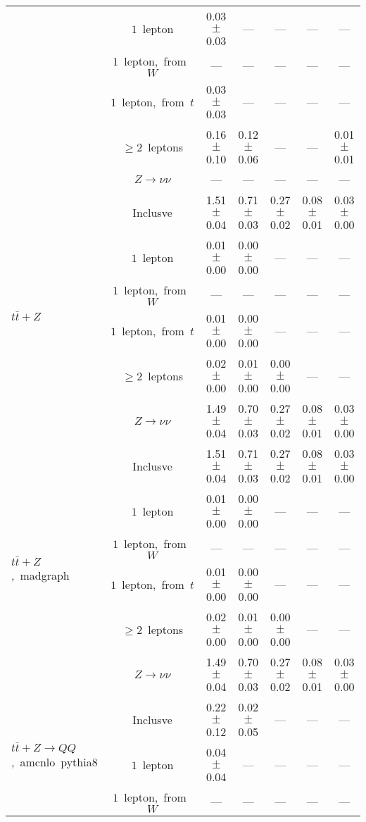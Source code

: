 \documentclass{article}
\begin{document}
\begin{longtable}{|l|c|c|c|c|c|c|}
 & $1$~lepton  & 0.03 $\pm$ 0.03  & ---  & ---  & ---  & --- \\* 
 & $1$~lepton,~from~$W$  & ---  & ---  & ---  & ---  & --- \\* 
 & $1$~lepton,~from~$t$  & 0.03 $\pm$ 0.03  & ---  & ---  & ---  & --- \\* 
 & $\ge2$~leptons  & 0.16 $\pm$ 0.10  & 0.12 $\pm$ 0.06  & ---  & ---  & 0.01 $\pm$ 0.01 \\* 
 & $Z\rightarrow\nu\nu$  & ---  & ---  & ---  & ---  & --- \\* 
\hline 
\multirow{6}{*}{$t\bar{t}+Z$} & Inclusve  & 1.51 $\pm$ 0.04  & 0.71 $\pm$ 0.03  & 0.27 $\pm$ 0.02  & 0.08 $\pm$ 0.01  & 0.03 $\pm$ 0.00 \\* 
 & $1$~lepton  & 0.01 $\pm$ 0.00  & 0.00 $\pm$ 0.00  & ---  & ---  & --- \\* 
 & $1$~lepton,~from~$W$  & ---  & ---  & ---  & ---  & --- \\* 
 & $1$~lepton,~from~$t$  & 0.01 $\pm$ 0.00  & 0.00 $\pm$ 0.00  & ---  & ---  & --- \\* 
 & $\ge2$~leptons  & 0.02 $\pm$ 0.00  & 0.01 $\pm$ 0.00  & 0.00 $\pm$ 0.00  & ---  & --- \\* 
 & $Z\rightarrow\nu\nu$  & 1.49 $\pm$ 0.04  & 0.70 $\pm$ 0.03  & 0.27 $\pm$ 0.02  & 0.08 $\pm$ 0.01  & 0.03 $\pm$ 0.00 \\* 
\hline 
\multirow{6}{*}{$t\bar{t}+Z$,~madgraph} & Inclusve  & 1.51 $\pm$ 0.04  & 0.71 $\pm$ 0.03  & 0.27 $\pm$ 0.02  & 0.08 $\pm$ 0.01  & 0.03 $\pm$ 0.00 \\* 
 & $1$~lepton  & 0.01 $\pm$ 0.00  & 0.00 $\pm$ 0.00  & ---  & ---  & --- \\* 
 & $1$~lepton,~from~$W$  & ---  & ---  & ---  & ---  & --- \\* 
 & $1$~lepton,~from~$t$  & 0.01 $\pm$ 0.00  & 0.00 $\pm$ 0.00  & ---  & ---  & --- \\* 
 & $\ge2$~leptons  & 0.02 $\pm$ 0.00  & 0.01 $\pm$ 0.00  & 0.00 $\pm$ 0.00  & ---  & --- \\* 
 & $Z\rightarrow\nu\nu$  & 1.49 $\pm$ 0.04  & 0.70 $\pm$ 0.03  & 0.27 $\pm$ 0.02  & 0.08 $\pm$ 0.01  & 0.03 $\pm$ 0.00 \\* 
\hline 
\multirow{6}{*}{$t\bar{t}+Z{\rightarrow}QQ$,~amcnlo~pythia8} & Inclusve  & 0.22 $\pm$ 0.12  & 0.02 $\pm$ 0.05  & ---  & ---  & --- \\* 
 & $1$~lepton  & 0.04 $\pm$ 0.04  & ---  & ---  & ---  & --- \\* 
 & $1$~lepton,~from~$W$  & ---  & ---  & ---  & ---  & --- \\* 

\end{longtable}
\end{document}
